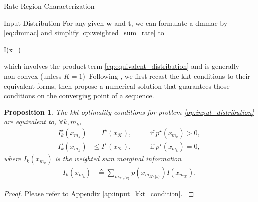 \documentclass[journal]{IEEEtran}
\newtheorem{proposition}{Proposition}
\begin{document}
\begin{section}{Rate-Region Characterization}
	\begin{subsection}{Input Distribution}
		\label{sc:input_distribution}
		For any given $\boldsymbol{w}$ and $\boldsymbol{t}$, we can formulate a \gls{dmmac} by \eqref{eq:dmmac} and simplify \eqref{op:weighted_sum_rate} to
		\begin{maxi!}
			{}{I(x_{})}{\label{op:input_distribution}}{}
			\addConstraint{\eqref{co:sum_probability},\eqref{co:nonnegative_probability},}
		\end{maxi!}
		which involves the product term \eqref{eq:equivalent_distribution} and is generally non-convex (unless $K=1$).
		Following \cite{Rezaeian2004}, we first recast the \gls{kkt} conditions to their equivalent forms, then propose a numerical solution that guarantees those conditions on the converging point of a sequence.
		\begin{proposition}
			The \gls{kkt} optimality conditions for problem \eqref{op:input_distribution} are equivalent to, $\forall k,m_k$,
			\begin{subequations}
				\label{eq:input_kkt_condition}
				\begin{alignat}{2}
					I_k^\star(x_{m_k}) & = I^\star(x_{\mathcal{K}}), \quad   &  & \text{if} \ p^\star(x_{m_k}) > 0,\label{eq:probable_states} \\
					I_k^\star(x_{m_k}) & \le I^\star(x_{\mathcal{K}}), \quad &  & \text{if} \ p^\star(x_{m_k}) = 0,\label{eq:dropped_states}
				\end{alignat}
			\end{subequations}
			where $I_k(x_{m_k})$ is the weighted sum marginal information
			\begin{align}
				I_k(x_{m_k})
				 & \triangleq \sum_{m_{\mathcal{K} \setminus \{k\}}} p(x_{m_{\mathcal{K} \setminus \{k\}}}) I(x_{m_\mathcal{K}}).
				\label{eq:weighted_sum_marginal_information}
			\end{align}
			\label{pr:input_kkt_condition}
		\end{proposition}

		\begin{proof}
			Please refer to Appendix \ref{ap:input_kkt_condition}.
			\label{pf:input_kkt_condition}
		\end{proof}


\end{subsection}
\end{section}
\end{document}
